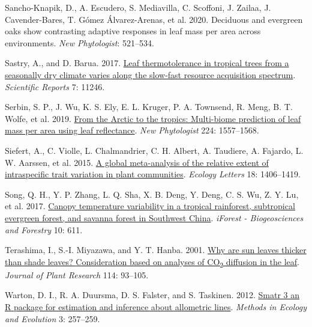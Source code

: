 \documentclass[
  12pt,
  a4paper,
,tablecaptionabove
]{scrartcl}
\newlength{\cslhangindent}
\newenvironment{CSLReferences}[2] %
 {%
  \setlength{\parindent}{0pt}
  \ifodd #1 \everypar{\setlength{\hangindent}{\cslhangindent}}\ignorespaces\fi
  \ifnum #2 > 0
  \setlength{\parskip}{#2\baselineskip}
  \fi
 }%
 {}
\begin{document}
\begin{CSLReferences}{1}{0}
\leavevmode{}%
Sancho-Knapik, D., A. Escudero, S. Mediavilla, C. Scoffoni, J. Zailaa, J. Cavender-Bares, T. Gómez Álvarez-Arenas, et al. 2020. Deciduous and evergreen oaks show contrasting adaptive responses in leaf mass per area across environments. \emph{New Phytologist}: 521--534.

\leavevmode{}%
Sastry, A., and D. Barua. 2017. \href{https://doi.org/10.1038/s41598-017-11343-5}{Leaf thermotolerance in tropical trees from a seasonally dry climate varies along the slow-fast resource acquisition spectrum}. \emph{Scientific Reports} 7: 11246.

\leavevmode{}%
Serbin, S. P., J. Wu, K. S. Ely, E. L. Kruger, P. A. Townsend, R. Meng, B. T. Wolfe, et al. 2019. \href{https://doi.org/10.1111/nph.16123}{From the {Arctic} to the tropics: Multi-biome prediction of leaf mass per area using leaf reflectance}. \emph{New Phytologist} 224: 1557--1568.

\leavevmode{}%
Siefert, A., C. Violle, L. Chalmandrier, C. H. Albert, A. Taudiere, A. Fajardo, L. W. Aarssen, et al. 2015. \href{https://doi.org/10.1111/ele.12508}{A global meta-analysis of the relative extent of intraspecific trait variation in plant communities}. \emph{Ecology Letters} 18: 1406--1419.

\leavevmode{}%
Song, Q. H., Y. P. Zhang, L. Q. Sha, X. B. Deng, Y. Deng, C. S. Wu, Z. Y. Lu, et al. 2017. \href{https://doi.org/10.3832/ifor2223-010}{Canopy temperature variability in a tropical rainforest, subtropical evergreen forest, and savanna forest in {Southwest China}}. \emph{iForest - Biogeosciences and Forestry} 10: 611.

\leavevmode{}%
Terashima, I., S.-I. Miyazawa, and Y. T. Hanba. 2001. \href{https://doi.org/10.1007/PL00013972}{Why are sun leaves thicker than shade leaves? \textemdash{} {Consideration} based on analyses of {CO}{\textsubscript{2}} diffusion in the leaf}. \emph{Journal of Plant Research} 114: 93--105.

\leavevmode{}%
Warton, D. I., R. A. Duursma, D. S. Falster, and S. Taskinen. 2012. \href{https://doi.org/10.1111/j.2041-210X.2011.00153.x}{Smatr 3\textendash{} an {R} package for estimation and inference about allometric lines}. \emph{Methods in Ecology and Evolution} 3: 257--259.


\end{CSLReferences}
\end{document}
